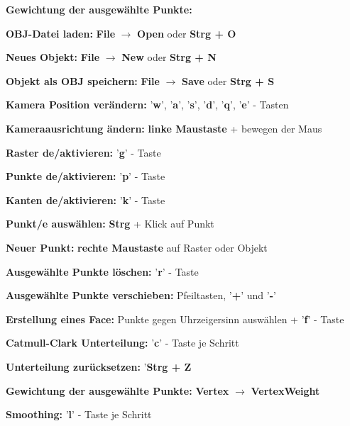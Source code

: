 \begin{labeling}[]{\textbf{Gewichtung der ausgewählte Punkte:}}%
\item [\textbf{OBJ-Datei laden:}] \textbf{File} $\rightarrow$ \textbf{Open} oder \textbf{Strg + O}
\item [\textbf{Neues Objekt:}] \textbf{File} $\rightarrow$ \textbf{New} oder \textbf{Strg + N}
\item [\textbf{Objekt als OBJ speichern:}] \textbf{File} $\rightarrow$ \textbf{Save} oder \textbf{Strg + S}
\newline
\item [\textbf{Kamera Position verändern:}] '\textbf{w}', '\textbf{a}', '\textbf{s}', '\textbf{d}', '\textbf{q}', '\textbf{e}' - Tasten
\item [\textbf{Kameraausrichtung ändern:}] \textbf{linke Maustaste} + bewegen der Maus
\newline
\item [\textbf{Raster de/aktivieren:}] '\textbf{g}' - Taste
\item [\textbf{Punkte de/aktivieren:}] '\textbf{p}' - Taste
\item [\textbf{Kanten de/aktivieren:}] '\textbf{k}' - Taste
\newline
\item [\textbf{Punkt/e auswählen:}] \textbf{Strg} + Klick auf Punkt
\item [\textbf{Neuer Punkt:}] \textbf{rechte Maustaste} auf Raster oder Objekt
\item [\textbf{Ausgewählte Punkte löschen:}] '\textbf{r}' - Taste
\item [\textbf{Ausgewählte Punkte verschieben:}] Pfeiltasten, '\textbf{+}' und '\textbf{-}'
\newline
\item [\textbf{Erstellung eines Face:}] Punkte gegen Uhrzeigersinn auswählen + '\textbf{f}' - Taste
\newline
\item [\textbf{Catmull-Clark Unterteilung:}] '\textbf{c}' - Taste je Schritt
\item [\textbf{Unterteilung zurücksetzen:}] '\textbf{Strg + Z}
\newline
\item [\textbf{Gewichtung der ausgewählte Punkte:}] \textbf{Vertex} $\rightarrow$ \textbf{VertexWeight}
\newline
\item [\textbf{Smoothing:}] '\textbf{l}' - Taste je Schritt
\end{labeling}

